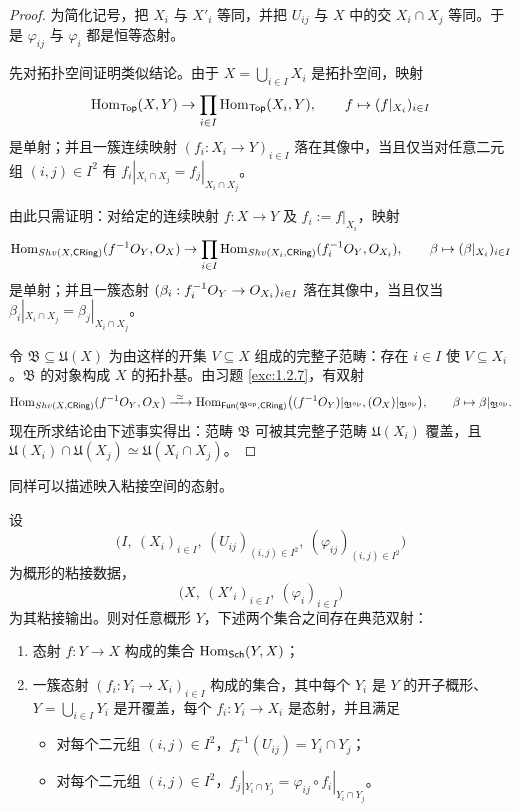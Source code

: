 \begin{proof}
为简化记号，把 $X_i$ 与 $X'_i$ 等同，并把 $U_{ij}$ 与 $X$ 中的交 $X_i\cap X_j$ 等同。于是 $\varphi_{ij}$ 与 $\varphi_i$ 都是恒等态射。

先对拓扑空间证明类似结论。由于 $X=\bigcup_{i\in I}X_i$ 是拓扑空间，映射
\[
\operatorname{Hom}_{\mathsf{Top}}(X,Y)\to\prod_{i\in I}\operatorname{Hom}_{\mathsf{Top}}(X_i,Y),
\qquad
f\mapsto(f|_{X_i})_{i\in I}
\]
是单射；并且一簇连续映射 $(f_i:X_i\to Y)_{i\in I}$ 落在其像中，当且仅当对任意二元组 $(i,j)\in I^2$ 有 $f_i|_{X_i\cap X_j}=f_j|_{X_i\cap X_j}$。

由此只需证明：对给定的连续映射 $f:X\to Y$ 及 $f_i:=f|_{X_i}$，映射
\[
\operatorname{Hom}_{Shv(X,\mathsf{CRing})}(f^{-1}O_Y,O_X)\to\prod_{i\in I}\operatorname{Hom}_{Shv(X_i,\mathsf{CRing})}(f_i^{-1}O_Y,O_{X_i}),
\qquad
\beta\mapsto(\beta|_{X_i})_{i\in I}
\]
是单射；并且一簇态射 $(\beta_i:f_i^{-1}O_Y\to O_{X_i})_{i\in I}$ 落在其像中，当且仅当 $\beta_i|_{X_i\cap X_j}=\beta_j|_{X_i\cap X_j}$。

令 $\mathfrak{B}\subseteq\mathfrak{U}(X)$ 为由这样的开集 $V\subseteq X$ 组成的完整子范畴：存在 $i\in I$ 使 $V\subseteq X_i$。$\mathfrak{B}$ 的对象构成 $X$ 的拓扑基。由习题 \ref{exc:1.2.7}，有双射
\[
\operatorname{Hom}_{Shv(X,\mathsf{CRing})}(f^{-1}O_Y,O_X)
\xrightarrow{\ \simeq\ }
\operatorname{Hom}_{\mathsf{Fun}(\mathfrak{B}^{\mathrm{op}},\mathsf{CRing})}\bigl((f^{-1}O_Y)|_{\mathfrak{B}^{\mathrm{op}}},(O_X)|_{\mathfrak{B}^{\mathrm{op}}}\bigr),
\qquad
\beta\mapsto\beta|_{\mathfrak{B}^{\mathrm{op}}}.
\]
现在所求结论由下述事实得出：范畴 $\mathfrak{B}$ 可被其完整子范畴 $\mathfrak{U}(X_i)$ 覆盖，且 $\mathfrak{U}(X_i)\cap\mathfrak{U}(X_j)\simeq\mathfrak{U}(X_i\cap X_j)$。
\end{proof}

同样可以描述映入粘接空间的态射。

\begin{propcon}\label{prop:6.1.4}
设
\[
\bigl(I,\ (X_i)_{i\in I},\ (U_{ij})_{(i,j)\in I^2},\ (\varphi_{ij})_{(i,j)\in I^2}\bigr)
\]
为概形的粘接数据，
\[
\bigl(X,\ (X'_i)_{i\in I},\ (\varphi_i)_{i\in I}\bigr)
\]
为其粘接输出。则对任意概形 $Y$，下述两个集合之间存在典范双射：
\begin{enumerate}[label=(\roman*),leftmargin=2em,itemsep=0.25ex]
  \item 态射 $f:Y\to X$ 构成的集合 $\operatorname{Hom}_{\mathsf{Sch}}(Y,X)$；
  \item 一簇态射 $(f_i:Y_i\to X_i)_{i\in I}$ 构成的集合，其中每个 $Y_i$ 是 $Y$ 的开子概形、$Y=\bigcup_{i\in I}Y_i$ 是开覆盖，每个 $f_i:Y_i\to X_i$ 是态射，并且满足
  \begin{itemize}[leftmargin=1.6em,itemsep=0.15ex]
    \item 对每个二元组 $(i,j)\in I^2$，$f_i^{-1}(U_{ij})=Y_i\cap Y_j$；
    \item 对每个二元组 $(i,j)\in I^2$，$f_j|_{Y_i\cap Y_j}=\varphi_{ij}\circ f_i|_{Y_i\cap Y_j}$。
  \end{itemize}
\end{enumerate}
\end{propcon}

